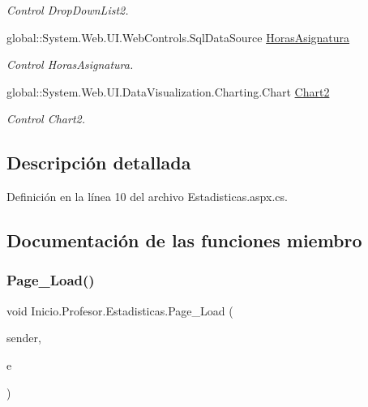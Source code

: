 \begin{DoxyCompactItemize}
\begin{DoxyCompactList}\small\item\em Control Drop\+Down\+List2. \end{DoxyCompactList}\item 
global\+::\+System.\+Web.\+U\+I.\+Web\+Controls.\+Sql\+Data\+Source \mbox{\hyperlink{classInicio_1_1Profesor_1_1Estadisticas_a09dc4adf28f35d11a3a0dece04617209}{Horas\+Asignatura}}
\begin{DoxyCompactList}\small\item\em Control Horas\+Asignatura. \end{DoxyCompactList}\item 
global\+::\+System.\+Web.\+U\+I.\+Data\+Visualization.\+Charting.\+Chart \mbox{\hyperlink{classInicio_1_1Profesor_1_1Estadisticas_a78faa17a7b2d5bb5d7d92a48869af0bf}{Chart2}}
\begin{DoxyCompactList}\small\item\em Control Chart2. \end{DoxyCompactList}\end{DoxyCompactItemize}


\subsection{Descripción detallada}


Definición en la línea 10 del archivo Estadisticas.\+aspx.\+cs.



\subsection{Documentación de las funciones miembro}
\mbox{\label{classInicio_1_1Profesor_1_1Estadisticas_a7df8e80159e715292a33d956e01cf592}} 
\subsubsection{\texorpdfstring{Page\_Load()}{Page\_Load()}}
{\footnotesize\ttfamily void Inicio.\+Profesor.\+Estadisticas.\+Page\+\_\+\+Load (\begin{DoxyParamCaption}\item[{object}]{sender,  }\item[{Event\+Args}]{e }\end{DoxyParamCaption})\hspace{0.3cm}{\ttfamily [protected]}}



